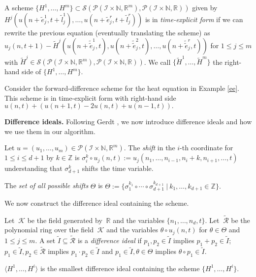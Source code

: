 \documentclass[runningheads]{llncs}
\newcommand{\Rr}{\mathbb{R}}
\newcommand{\Nn}{\mathbb{N}}
\newcommand{\Zz}{{\mathbb{Z}}}
\newcommand{\1}{\chi}
\newcommand{\Ii}{\mathcal{I}}
\begin{document}
\begin{definition}
	A scheme $\{H^1,\ldots,H^m\}\subset\mathcal{S}(\mathcal{P}(\Ii\times\Nn,\Rr^m),\mathcal{P}(\Ii\times\Nn,\Rr))$ given by
	$
		H^j(u(n+\tilde{e}_j^1,t+\tilde{l}_j^1),\ldots,u(n+\tilde{e}_j^r,t+\tilde{l}_j^r))
	$
	is in \emph{time-explicit form} if we can rewrite the previous equation (eventually translating the scheme) as
$
		u_j(n,t+1)-\tilde{H}^j(u(n+\tilde{\tilde{e}}_j^1,t),u(n+\tilde{\tilde{e}}_j^2,t),\ldots,u(n+\tilde{\tilde{e}}_j^r,t))
$
	for $1\leq j\leq m$
	with $\tilde{H}^j\in\mathcal{S}(\mathcal{P}(\Ii\times\Nn,\Rr^m),\mathcal{P}(\Ii\times\Nn,\Rr))$. We call $\{\tilde{H}^1,\ldots,\tilde{H}^m\}$ the right-hand side of $\{H^1,\ldots,H^m\}$.
\end{definition}
\begin{example}\label{timeexplicitheateq}
	Consider the forward-difference scheme for the heat equation in Example \ref{ee}. 
	This scheme is in time-explicit form with right-hand side
	$
		u(n,t)+(u(n+1,t)-2u(n,t)+u(n-1,t)).
$
\end{example}
{\bf Difference ideals.}\label{diffid}
Following Gerdt \cite{gerdt12}, we now introduce difference ideals and how we use them in our algorithm.
\begin{definition}
	Let $u=(u_1,\dots,u_m)\in\mathcal{P}(\Ii\times\Nn,\Rr^m)$. The \emph{shift} in the $i$-th coordinate for $1\leq i\leq d+1$ by $k\in\Zz$ is
$
		\sigma_i^k\circ u_j(n,t):=u_j(n_1,\ldots,n_{i-1},n_i+k,n_{i+1},\ldots,t)
$
	understanding that $\sigma_{d+1}^k$ shifts the time variable.
\end{definition}
\begin{definition}
	The \emph{set of all possible shifts} $\Theta$ is
$
		\Theta:=\{\sigma_1^{k_1}\circ\cdots\circ\sigma_{d+1}^{k_{d+1}}\ |\ k_1,\ldots,k_{d+1}\in\Zz\}.
$
\end{definition}
We now construct the difference ideal containing the scheme.
\begin{definition}
	\label{diffideal}
	Let $\ \mathcal{K}$ be the field generated by $\ \Rr$ and the variables $\{n_1,\ldots,n_d,t\}$. Let $\ \tilde{\mathcal{R}}$ be the polynomial ring over the field $\ \mathcal{K}$ and the variables $\theta\circ u_j(n,t)$ for $\theta\in\Theta$ and $1\leq j\leq m$.
	A set $\tilde{I}\subseteq\tilde{\mathcal{R}}$ is a \emph{difference ideal} if
	$p_1,p_2\in\tilde{I}$ implies $p_1+p_2\in\tilde{I}$;
	$p_1\in\tilde{I},p_2\in\tilde{\mathcal{R}}$ implies $p_1\cdot p_2\in\tilde{I}$ and
	$p_1\in\tilde{I},\theta\in\Theta$ implies $\theta\circ p_1\in\tilde{I}$.
\end{definition}
\begin{definition}
	$\langle H^1,\ldots,H^i\rangle$ is the smallest difference ideal containing the scheme $\{H^1,\ldots,H^i\}$.
\end{definition}
\end{document}
